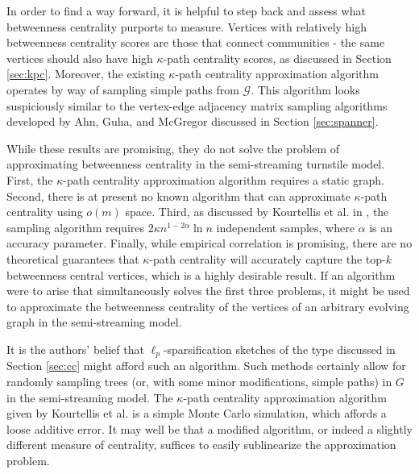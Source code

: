 \documentclass{report}
\begin{document}

In order to find a way forward, it is helpful to step back and assess what betweenness centrality purports to measure.
Vertices with relatively high betweenness centrality scores are those that connect communities - the same vertices should also have high $\kappa$-path centrality scores, as discussed in Section \ref{sec:kpc}. 
Moreover, the existing $\kappa$-path centrality approximation algorithm operates by way of sampling simple paths from $\mathcal{G}$.
This algorithm looks suspiciously similar to the vertex-edge adjacency matrix sampling algorithms developed by Ahn, Guha, and McGregor discussed in Section \ref{sec:spanner}. 

While these results are promising, they do not solve the problem of approximating betweenness centrality in the semi-streaming turnstile model. 
First, the $\kappa$-path centrality approximation algorithm requires a static graph. 
Second, there is at present no known algorithm that can approximate $\kappa$-path centrality using $o(m)$ space. 
Third, as discussed by Kourtellis et al. in \cite{kourtellis2013identifying}, the sampling algorithm requires $2 \kappa n^{1-2\alpha} \ln n$ independent samples, where $\alpha$ is an accuracy parameter. 
Finally, while empirical correlation is promising, there are no theoretical guarantees that $\kappa$-path centrality will accurately capture the top-$k$ betweenness central vertices, which is a highly desirable result. 
If an algorithm were to arise that simultaneously solves the first three problems, it might be used to approximate the betweenness centrality of the vertices of an arbitrary evolving graph in the semi-streaming model. 

It is the authors' belief that $\ell_p$-sparsification sketches of the type discussed in Section \ref{sec:cc} might afford such an algorithm. 
Such methods certainly allow for randomly sampling trees (or, with some minor modifications, simple paths) in $G$ in the semi-streaming model.
The $\kappa$-path centrality approximation algorithm given by Kourtellis et al. is a simple Monte Carlo simulation, which affords a loose additive error.
It may well be that a modified algorithm, or indeed a slightly different measure of centrality, suffices to easily sublinearize the approximation problem.
\end{document}
